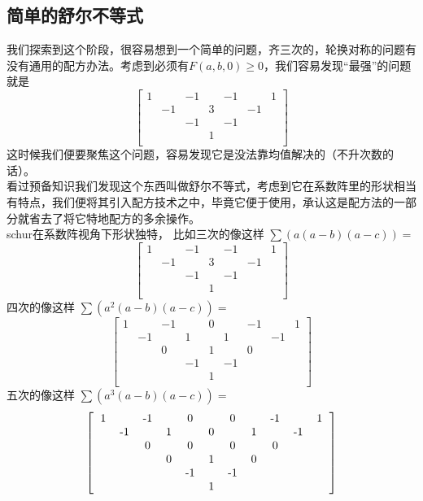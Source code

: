 \documentclass[UTF8]{ctexart}
\begin{document}
\subsection{简单的舒尔不等式}
我们探索到这个阶段，很容易想到一个简单的问题，齐三次的，轮换对称的问题有没有通用的配方办法。考虑到必须有$ F(a,b,0) \geq 0 $，我们容易发现“最强”的问题就是
\renewcommand*{\arraystretch}{1.732}\[\left[\begin{matrix}
	1& &-1& &-1& &1\\
	&-1& &3& &-1&\\
	& &-1& &-1& & \\
	& & &1& & &\\
\end{matrix}\right]\]
这时候我们便要聚焦这个问题，容易发现它是没法靠均值解决的（不升次数的话）。\\
看过预备知识我们发现这个东西叫做舒尔不等式，考虑到它在系数阵里的形状相当有特点，我们便将其引入配方技术之中，毕竟它便于使用，承认这是配方法的一部分就省去了将它特地配方的多余操作。\\
schur在系数阵视角下形状独特，
比如三次的像这样
$ \displaystyle \sum (a(a-b)(a-c))= $
\renewcommand*{\arraystretch}{1.732}\[\left[\begin{matrix}
	1& &-1& &-1& &1\\
	&-1& &3& &-1&\\
	& &-1& &-1& & \\
	& & &1& & &\\
\end{matrix}\right]\]
四次的像这样
$ \displaystyle \sum (a^{2}(a-b)(a-c))= $
\renewcommand*{\arraystretch}{1.732}\[\left[\begin{matrix}
	1& &-1& &0& &-1& &1\\
	&-1& &1& &1& &-1&\\
	& &0& &1& &0& &\\
	& & &-1& &-1& & &\\
	& & & &1& & & &\\
\end{matrix}\right]\]
五次的像这样
$ \displaystyle \sum (a^{3}(a-b)(a-c))= $
\renewcommand*{\arraystretch}{1.732}\[\left[\begin{matrix}
	\begin{tabular}{ccccccccccccc}
		1& &-1& &0& &0& &-1& &1\\
		&-1& &1& &0& &1& &-1&\\
		& &0& &0& &0& &0& &\\
		& & &0& &1& &0& & &\\
		& & & &-1& &-1& & & &\\
		& & & & &1& & & & &\\
	\end{tabular}
\end{matrix}\right]\]
\end{document}

